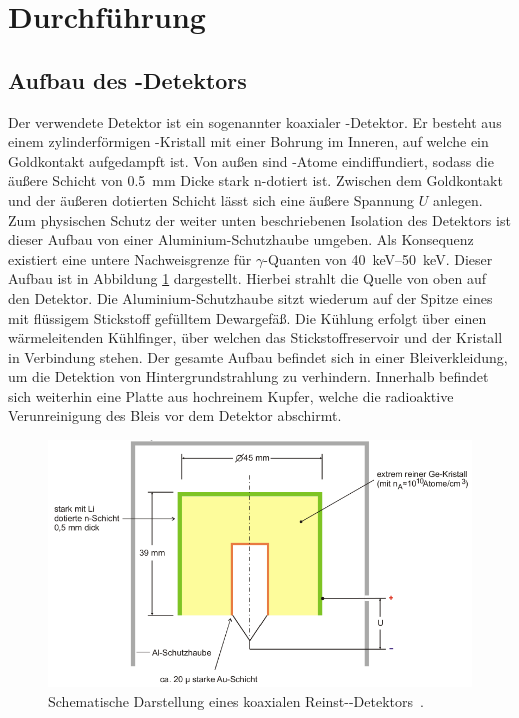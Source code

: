 \newpage
\section{Durchführung}
\label{sec:Durchführung}

\subsection{Aufbau des -Detektors}
\label{sec:AufbauDetektor}

Der verwendete Detektor ist ein sogenannter koaxialer -Detektor.
Er besteht aus einem zylinderförmigen -Kristall mit einer Bohrung im
Inneren, auf welche ein Goldkontakt aufgedampft ist. Von außen sind -Atome
eindiffundiert, sodass die äußere Schicht von \SI{0.5}{\milli\meter} Dicke
stark n-dotiert ist.
Zwischen dem Goldkontakt und der äußeren dotierten Schicht lässt sich eine äußere
Spannung $U$ anlegen.
Zum physischen Schutz der weiter unten beschriebenen Isolation des Detektors ist dieser Aufbau von einer Aluminium-Schutzhaube
umgeben. Als Konsequenz existiert eine untere Nachweisgrenze für $\gamma$-Quanten
von \SIrange{40}{50}{\kilo\electronvolt}.
Dieser Aufbau ist in Abbildung \ref{fig:Versuchsaufbau} dargestellt.
Hierbei strahlt die Quelle von oben auf den Detektor.
Die Aluminium-Schutzhaube sitzt wiederum auf der Spitze eines mit flüssigem
Stickstoff gefülltem Dewargefäß. Die Kühlung erfolgt über einen wärmeleitenden
Kühlfinger, über welchen das Stickstoffreservoir und der Kristall in Verbindung stehen.
Der gesamte Aufbau befindet sich in einer Bleiverkleidung, um die Detektion
von Hintergrundstrahlung zu verhindern. Innerhalb befindet sich weiterhin eine
Platte aus hochreinem Kupfer, welche die radioaktive Verunreinigung des Bleis vor dem
Detektor abschirmt.
\begin{figure}
	\centering
	\includegraphics[width=.8\textwidth]{images/Versuchsaufbau.pdf}
	\caption{Schematische Darstellung eines koaxialen Reinst--Detektors~\cite[14]{anleitung}.}
	\label{fig:Versuchsaufbau}
\end{figure}

